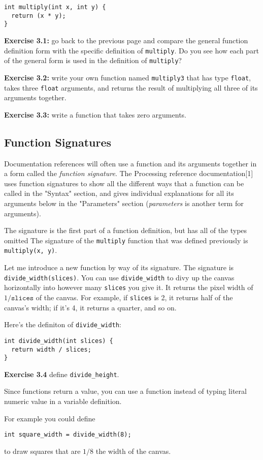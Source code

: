 \documentclass[
]{leaflet}
\begin{document}
\begin{lstlisting}
int multiply(int x, int y) {
  return (x * y);
}
\end{lstlisting}

\textbf{Exercise 3.1:} go back to the previous page and compare the general function definition form with the specific definition of \texttt{multiply}.
Do you see how each part of the general form is used in the definition of \texttt{multiply}?

\textbf{Exercise 3.2:} write your own function named \texttt{multiply3} that has type \texttt{float}, takes three \texttt{float} arguments, and returns the result of multiplying all three of its arguments together.

\textbf{Exercise 3.3:} write a function that takes zero arguments.

\subsection{Function Signatures}

Documentation references will often use a function and its arguments together in a form called the \textit{function signature}.
The Processing reference documentation[1] uses function signatures to show all the different ways that a function can be called in the "Syntax" section, and gives individual explanations for all its arguments below in the "Parameters" section (\textit{parameters} is another term for arguments).

The signature is the first part of a function definition, but has all of the types omitted
The signature of the \texttt{multiply} function that was defined previously is \texttt{multiply(x, y)}.

Let me introduce a new function by way of its signature.
The signature is \texttt{divide\_width(slices)}.
You can use \texttt{divide\_width} to divy up the canvas horizontally into however many \texttt{slices} you give it.
It returns the pixel width of $1/\texttt{slices}$ of the canvas.
For example, if \texttt{slices} is 2, it returns half of the canvas's width; if it's 4, it returns a quarter, and so on.

Here's the definiton of \texttt{divide\_width}:
\begin{lstlisting}
int divide_width(int slices) {
  return width / slices;
}
\end{lstlisting}

\textbf{Exercise 3.4} define \texttt{divide\_height}.

Since functions return a value, you can use a function instead of typing literal numeric value in a variable definition.

For example you could define
\begin{lstlisting}
int square_width = divide_width(8);
\end{lstlisting}
\vspace{-0.5em}
to draw squares that are $1/8$ the width of the canvas.



\loggingall
\end{document}
